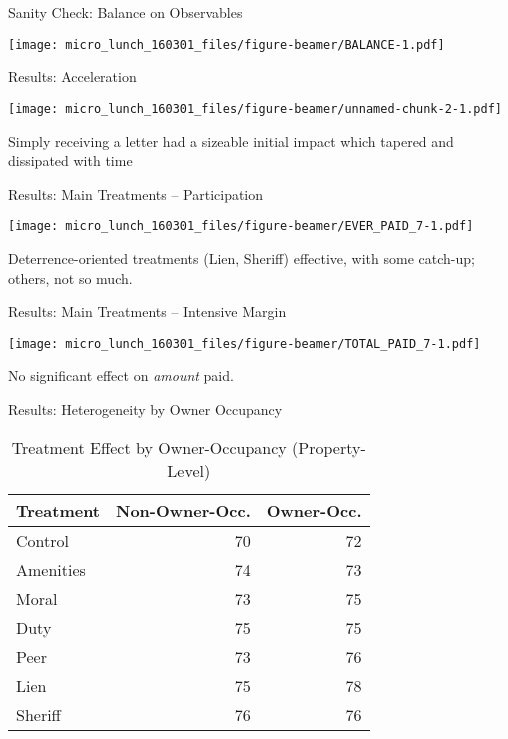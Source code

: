 \documentclass[ignorenonframetext,]{beamer}
\begin{document}
\begin{frame}{Sanity Check: Balance on Observables}

\texttt{[image: micro\_lunch\_160301\_files/figure-beamer/BALANCE-1.pdf]}

\end{frame}

\begin{frame}{Results: Acceleration}

\texttt{[image: micro\_lunch\_160301\_files/figure-beamer/unnamed-chunk-2-1.pdf]}

Simply receiving a letter had a sizeable initial impact which tapered
and dissipated with time

\end{frame}

\begin{frame}{Results: Main Treatments -- Participation}

\texttt{[image: micro\_lunch\_160301\_files/figure-beamer/EVER\_PAID\_7-1.pdf]}

Deterrence-oriented treatments (Lien, Sheriff) effective, with some
catch-up; others, not so much.

\end{frame}

\begin{frame}{Results: Main Treatments -- Intensive Margin}

\texttt{[image: micro\_lunch\_160301\_files/figure-beamer/TOTAL\_PAID\_7-1.pdf]}

No significant effect on \emph{amount} paid.

\end{frame}

\begin{frame}{Results: Heterogeneity by Owner Occupancy}

\begin{table}[ht]
\centering
\begin{tabular}{lrr}
  \hline
Treatment & Non-Owner-Occ. & Owner-Occ. \\ 
  \hline
Control & 70 & 72 \\ 
  Amenities & 74 & 73 \\ 
  Moral & 73 & 75 \\ 
  Duty & 75 & 75 \\ 
  Peer & 73 & 76 \\ 
  Lien & 75 & 78 \\ 
  Sheriff & 76 & 76 \\ 
   \hline
\end{tabular}
\caption{Treatment Effect by Owner-Occupancy (Property-Level)} 
\label{table:delta_by_owner_occ}
\end{table}

\end{frame}
\end{document}
